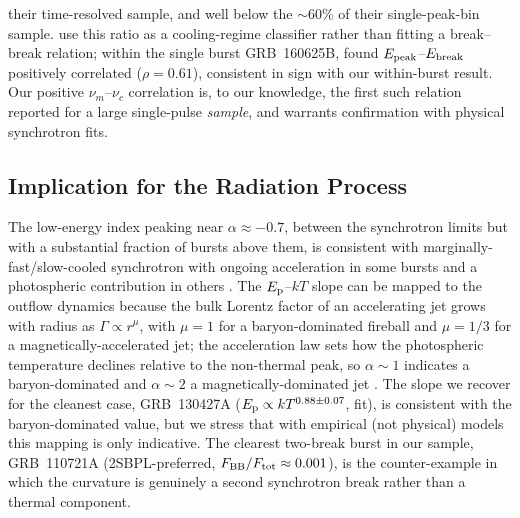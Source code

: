 \documentclass[twocolumn]{aastex631}
\newcommand{\nuc}{\ensuremath{\nu_c}}
\newcommand{\num}{\ensuremath{\nu_m}}
\newcommand{\Ep}{\ensuremath{E_{\rm p}}}
\newcommand{\kT}{\ensuremath{kT}}
\begin{document}
their time-resolved sample, and well below the $\sim$$60\%$ of their
single-peak-bin sample. \citet{Mei2025} use this ratio as a cooling-regime
classifier rather than fitting a break--break relation; within the single burst GRB~160625B,
\citet{Ravasio2018} found $E_{\rm peak}$--$E_{\rm break}$ positively correlated
($\rho=0.61$), consistent in sign with our within-burst result. Our positive
$\num$--$\nuc$ correlation is, to our knowledge, the first such relation
reported for a large single-pulse \emph{sample}, and warrants confirmation
with physical synchrotron fits.

\subsection{Implication for the Radiation Process} \label{sec:disc-radiation}
The low-energy index peaking near $\alpha\approx-0.7$, between the
synchrotron limits but with a substantial fraction of bursts above them, is
consistent with marginally-fast/slow-cooled synchrotron with ongoing
acceleration in some bursts and a photospheric contribution in others
\citep[cf.][]{Basak2014,Burgess2014b}. The $\Ep$--$\kT$ slope can be mapped to
the outflow dynamics because the bulk Lorentz factor of an accelerating jet
grows with radius as $\Gamma\propto r^{\mu}$, with $\mu=1$ for a
baryon-dominated fireball and $\mu=1/3$ for a magnetically-accelerated jet;
the acceleration law sets how the photospheric temperature declines relative
to the non-thermal peak, so $\alpha\!\sim\!1$ indicates a baryon-dominated and
$\alpha\!\sim\!2$ a magnetically-dominated jet \citep{Burgess2014a}. The slope
we recover for the cleanest case, GRB~130427A
($\Ep\propto\kT^{0.88\pm0.07}$, \citealt{DAgostini2005} fit), is consistent
with the baryon-dominated value, but we stress that with empirical (not
physical) models this mapping is only indicative. The clearest two-break burst
in our sample, GRB~110721A (2SBPL-preferred, $F_{\rm BB}/F_{\rm
tot}\approx0.001$), is the counter-example in which the curvature is genuinely
a second synchrotron break rather than a thermal component.

\end{document}
